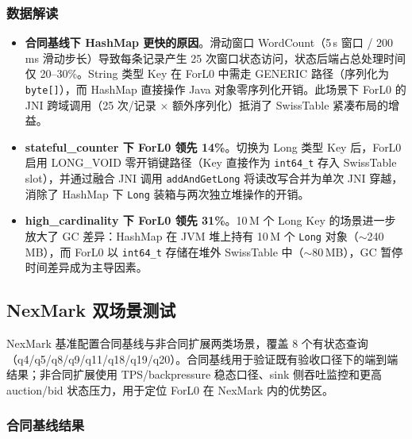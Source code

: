 \documentclass[a4paper,11pt]{article}
\begin{document}
\subsubsection{数据解读}

\begin{itemize}
  \item \textbf{合同基线下 HashMap 更快的原因}。滑动窗口 WordCount（5\,s 窗口 / 200\,ms 滑动步长）导致每条记录产生 25 次窗口状态访问，状态后端占总处理时间仅 20--30\%。String 类型 Key 在 ForL0 中需走 GENERIC 路径（序列化为 \texttt{byte[]}），而 HashMap 直接操作 Java 对象零序列化开销。此场景下 ForL0 的 JNI 跨域调用（25 次/记录 $\times$ 额外序列化）抵消了 SwissTable 紧凑布局的增益。
  \item \textbf{stateful\_counter 下 ForL0 领先 14\%}。切换为 Long 类型 Key 后，ForL0 启用 LONG\_VOID 零开销键路径（Key 直接作为 \texttt{int64\_t} 存入 SwissTable slot），并通过融合 JNI 调用 \texttt{addAndGetLong} 将读改写合并为单次 JNI 穿越，消除了 HashMap 下 \texttt{Long} 装箱与两次独立堆操作的开销。
  \item \textbf{high\_cardinality 下 ForL0 领先 31\%}。10\,M 个 Long Key 的场景进一步放大了 GC 差异：HashMap 在 JVM 堆上持有 10\,M 个 \texttt{Long} 对象（$\sim$240\,MB），而 ForL0 以 \texttt{int64\_t} 存储在堆外 SwissTable 中（$\sim$80\,MB），GC 暂停时间差异成为主导因素。
\end{itemize}

\subsection{NexMark 双场景测试}

NexMark 基准配置合同基线与非合同扩展两类场景，覆盖 8 个有状态查询（q4/q5/q8/q9/q11/q18/q19/q20）。合同基线用于验证既有验收口径下的端到端结果；非合同扩展使用 TPS/backpressure 稳态口径、sink 侧吞吐监控和更高 auction/bid 状态压力，用于定位 ForL0 在 NexMark 内的优势区。

\subsubsection{合同基线结果}
\end{document}
